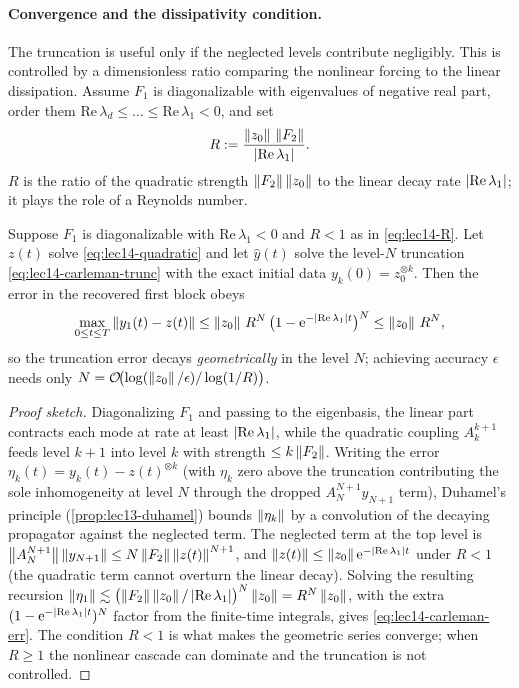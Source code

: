 \paragraph{Convergence and the dissipativity condition.}
The truncation is useful only if the neglected levels contribute negligibly. This is controlled
by a dimensionless ratio comparing the nonlinear forcing to the linear dissipation. Assume $F_1$
is diagonalizable with eigenvalues of negative real part, order them $\mathrm{Re}\,\lambda_d\le
\dots\le\mathrm{Re}\,\lambda_1<0$, and set
\begin{equation}
  R:=\frac{\left\lVert z_0 \right\rVert\,\left\lVert F_2 \right\rVert}{\left\lvert \mathrm{Re}\,\lambda_1 \right\rvert}.
  \label{eq:lec14-R}
\end{equation}
$R$ is the ratio of the quadratic strength $\left\lVert F_2 \right\rVert\left\lVert z_0 \right\rVert$ to the linear decay rate
$\left\lvert \mathrm{Re}\,\lambda_1 \right\rvert$; it plays the role of a Reynolds number.

\begin{theorem}
\label{thm:lec14-carleman}
Suppose $F_1$ is diagonalizable with $\mathrm{Re}\,\lambda_1<0$ and $R<1$ as in
\eqref{eq:lec14-R}. Let $z(t)$ solve \eqref{eq:lec14-quadratic} and let $\hat y(t)$ solve the
level-$N$ truncation \eqref{eq:lec14-carleman-trunc} with the exact initial data
$y_k(0)=z_0^{\otimes k}$. Then the error in the recovered first block obeys
\begin{equation}
  \max_{0\le t\le T}\left\lVert y_1(t)-z(t) \right\rVert
  \le\left\lVert z_0 \right\rVert\,R^{N}\,\bigl(1-\mathrm{e}^{-\left\lvert \mathrm{Re}\,\lambda_1 \right\rvert t}\bigr)^{N}
  \le\left\lVert z_0 \right\rVert\,R^{N},
  \label{eq:lec14-carleman-err}
\end{equation}
so the truncation error decays \emph{geometrically} in the level $N$; achieving accuracy
$\epsilon$ needs only $N=\mathcal O\!\bigl(\log(\left\lVert z_0 \right\rVert/\epsilon)/\log(1/R)\bigr)$.
\end{theorem}

\begin{proof}[Proof sketch]
Diagonalizing $F_1$ and passing to the eigenbasis, the linear part contracts each mode at rate at
least $\left\lvert \mathrm{Re}\,\lambda_1 \right\rvert$, while the quadratic coupling $A_k^{k+1}$ feeds level $k+1$
into level $k$ with strength $\le k\left\lVert F_2 \right\rVert$. Writing the error $\eta_k(t)=y_k(t)-z(t)^{\otimes
k}$ (with $\eta_k$ zero above the truncation contributing the sole inhomogeneity at level $N$
through the dropped $A_N^{N+1}y_{N+1}$ term), Duhamel's principle (\cref{prop:lec13-duhamel})
bounds $\left\lVert \eta_k \right\rVert$ by a convolution of the decaying propagator against the neglected term.
The neglected term at the top level is $\left\lVert A_N^{N+1} \right\rVert\left\lVert y_{N+1} \right\rVert\le N\left\lVert F_2 \right\rVert
\left\lVert z(t) \right\rVert^{N+1}$, and $\left\lVert z(t) \right\rVert\le\left\lVert z_0 \right\rVert\mathrm{e}^{-\left\lvert \mathrm{Re}\,\lambda_1 \right\rvert t}$ under
$R<1$ (the quadratic term cannot overturn the linear decay). Solving the resulting recursion
$\left\lVert \eta_1 \right\rVert\lesssim\bigl(\left\lVert F_2 \right\rVert\left\lVert z_0 \right\rVert/\left\lvert \mathrm{Re}\,\lambda_1 \right\rvert\bigr)^{N}\left\lVert z_0 \right\rVert
=R^N\left\lVert z_0 \right\rVert$, with the extra $(1-\mathrm{e}^{-\left\lvert \mathrm{Re}\,\lambda_1 \right\rvert t})^N$ factor from the
finite-time integrals, gives \eqref{eq:lec14-carleman-err}. The condition $R<1$ is what makes the
geometric series converge; when $R\ge1$ the nonlinear cascade can dominate and the truncation is
not controlled.
\end{proof}


